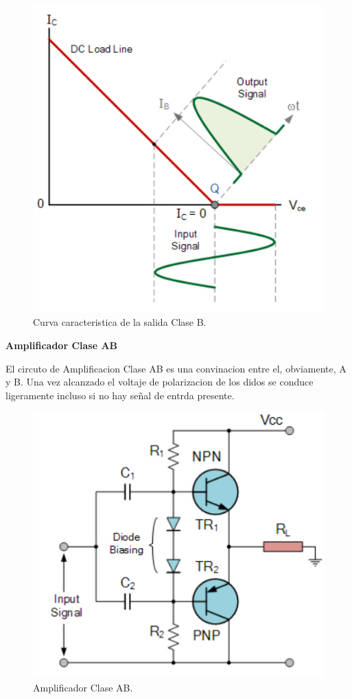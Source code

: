 \documentclass[letterpaper]{article}
\begin{document}
\begin{large}
\begin{figure}[htbp]
                \includegraphics[scale=0.5]{IMG/CURVB}
                \caption{Curva caracteristica de la salida Clase B.}
            \end{figure} \newpage
        \begin{center}
            \textbf{Amplificador Clase AB}
        \end{center}
        El circuto de Amplificacion Clase AB es una convinacion entre el, obviamente, A y B. Una vez alcanzado el voltaje de polarizacion de los didos se conduce ligeramente incluso si no hay señal de entrda presente.\
        \begin{figure}[htbp]
            \centering
            \includegraphics[scale=0.5]{IMG/AmpAB.jpg}
            \caption{Amplificador Clase AB.}
            \label{fig:cir2}
        \end{figure}
        \end{large}
\end{document}
